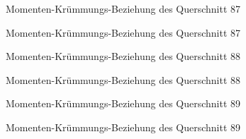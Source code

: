 \documentclass[
  11pt,
  letterpaper,
]{scrreprt}
\begin{document}
\begin{figure}[H]


\caption{\label{fig-qs_87}Momenten-Krümmungs-Beziehung des Querschnitt
87}

\end{figure}%

\begin{figure}[H]


\caption{\label{fig-m_chi_87}Momenten-Krümmungs-Beziehung des
Querschnitt 87}

\end{figure}%

\begin{figure}[H]


\caption{\label{fig-qs_88}Momenten-Krümmungs-Beziehung des Querschnitt
88}

\end{figure}%

\begin{figure}[H]


\caption{\label{fig-m_chi_88}Momenten-Krümmungs-Beziehung des
Querschnitt 88}

\end{figure}%

\begin{figure}[H]


\caption{\label{fig-qs_89}Momenten-Krümmungs-Beziehung des Querschnitt
89}

\end{figure}%

\begin{figure}[H]


\caption{\label{fig-m_chi_89}Momenten-Krümmungs-Beziehung des
Querschnitt 89}

\end{figure}%
\end{document}
